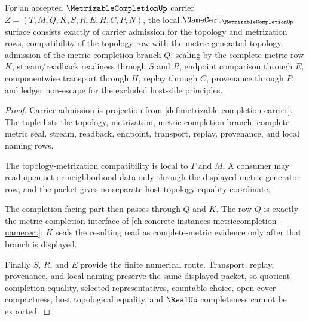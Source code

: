 \begin{theorem}
\label{thm:metrizable-completion-namecert-obligations}
For an accepted $\MetrizableCompletionUp$ carrier $Z=(T,M,Q,K,S,R,E,H,C,P,N)$, the local $\NameCert_{\MetrizableCompletionUp}$ surface consists exactly of carrier admission for the topology and metrization rows, compatibility of the topology row with the metric-generated topology, admission of the metric-completion branch $Q$, sealing by the complete-metric row $K$, stream/readback readiness through $S$ and $R$, endpoint comparison through $E$, componentwise transport through $H$, replay through $C$, provenance through $P$, and ledger non-escape for the excluded host-side principles.
\end{theorem}
\begin{proof}
Carrier admission is projection from \autoref{def:metrizable-completion-carrier}. The tuple lists the topology, metrization, metric-completion branch, complete-metric seal, stream, readback, endpoint, transport, replay, provenance, and local naming rows.

The topology-metrization compatibility is local to $T$ and $M$. A consumer may read open-set or neighborhood data only through the displayed metric generator row, and the packet gives no separate host-topology equality coordinate.

The completion-facing part then passes through $Q$ and $K$. The row $Q$ is exactly the metric-completion interface of \autoref{ch:concrete-instances-metriccompletion-namecert}; $K$ seals the resulting read as complete-metric evidence only after that branch is displayed.

Finally $S$, $R$, and $E$ provide the finite numerical route. Transport, replay, provenance, and local naming preserve the same displayed packet, so quotient completion equality, selected representatives, countable choice, open-cover compactness, host topological equality, and $\RealUp$ completeness cannot be exported.
\end{proof}

